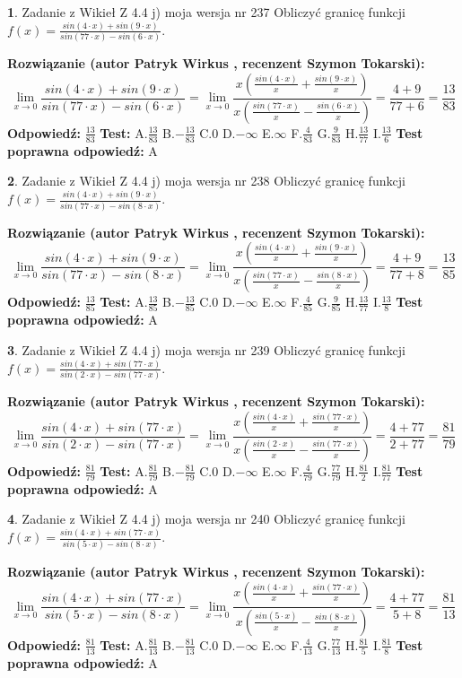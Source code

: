 \documentclass[12pt, a4paper]{article}
\theoremstyle{definition} %
\newtheorem{zad}{}
\newcommand{\zadStart}[1]{\begin{zad}#1\newline}
\newcommand{\zadStop}{\end{zad}}
\newcommand{\rozwStart}[2]{\noindent \textbf{Rozwiązanie (autor #1 , recenzent #2): }\newline}
\newcommand{\rozwStop}{\newline}
\newcommand{\odpStart}{\noindent \textbf{Odpowiedź:}\newline}
\newcommand{\odpStop}{\newline}
\newcommand{\testStart}{\noindent \textbf{Test:}\newline}
\newcommand{\testStop}{\newline}
\newcommand{\kluczStart}{\noindent \textbf{Test poprawna odpowiedź:}\newline}
\newcommand{\kluczStop}{\newline}
\begin{document}
\zadStart{Zadanie z Wikieł Z 4.4 j) moja wersja nr 237}
Obliczyć granicę funkcji $f(x)=\frac{sin(4\cdot x) +sin(9\cdot x)}{sin(77\cdot x) -sin(6\cdot x)}$.
\zadStop
\rozwStart{Patryk Wirkus}{Szymon Tokarski}
$$\lim\limits_{x\to 0}\frac{sin(4\cdot x) +sin(9\cdot x)}{sin(77\cdot x) -sin(6\cdot x)}=\lim\limits_{x\to 0}\frac{x(\frac{sin(4\cdot x)}{x}+\frac{sin(9\cdot x)}{x})}{x(\frac{sin(77\cdot x)}{x}-\frac{sin(6\cdot x)}{x})}=\frac{4+9}{77+6} = \frac{13}{83}$$
\rozwStop
\odpStart
$\frac{13}{83}$
\odpStop
\testStart
A.$\frac{13}{83}$
B.$-\frac{13}{83}$
C.$0$
D.$-\infty$
E.$\infty$
F.$\frac{4}{83}$
G.$\frac{9}{83}$
H.$\frac{13}{77}$
I.$\frac{13}{6}$
\testStop
\kluczStart
A
\kluczStop



\zadStart{Zadanie z Wikieł Z 4.4 j) moja wersja nr 238}
Obliczyć granicę funkcji $f(x)=\frac{sin(4\cdot x) +sin(9\cdot x)}{sin(77\cdot x) -sin(8\cdot x)}$.
\zadStop
\rozwStart{Patryk Wirkus}{Szymon Tokarski}
$$\lim\limits_{x\to 0}\frac{sin(4\cdot x) +sin(9\cdot x)}{sin(77\cdot x) -sin(8\cdot x)}=\lim\limits_{x\to 0}\frac{x(\frac{sin(4\cdot x)}{x}+\frac{sin(9\cdot x)}{x})}{x(\frac{sin(77\cdot x)}{x}-\frac{sin(8\cdot x)}{x})}=\frac{4+9}{77+8} = \frac{13}{85}$$
\rozwStop
\odpStart
$\frac{13}{85}$
\odpStop
\testStart
A.$\frac{13}{85}$
B.$-\frac{13}{85}$
C.$0$
D.$-\infty$
E.$\infty$
F.$\frac{4}{85}$
G.$\frac{9}{85}$
H.$\frac{13}{77}$
I.$\frac{13}{8}$
\testStop
\kluczStart
A
\kluczStop



\zadStart{Zadanie z Wikieł Z 4.4 j) moja wersja nr 239}
Obliczyć granicę funkcji $f(x)=\frac{sin(4\cdot x) +sin(77\cdot x)}{sin(2\cdot x) -sin(77\cdot x)}$.
\zadStop
\rozwStart{Patryk Wirkus}{Szymon Tokarski}
$$\lim\limits_{x\to 0}\frac{sin(4\cdot x) +sin(77\cdot x)}{sin(2\cdot x) -sin(77\cdot x)}=\lim\limits_{x\to 0}\frac{x(\frac{sin(4\cdot x)}{x}+\frac{sin(77\cdot x)}{x})}{x(\frac{sin(2\cdot x)}{x}-\frac{sin(77\cdot x)}{x})}=\frac{4+77}{2+77} = \frac{81}{79}$$
\rozwStop
\odpStart
$\frac{81}{79}$
\odpStop
\testStart
A.$\frac{81}{79}$
B.$-\frac{81}{79}$
C.$0$
D.$-\infty$
E.$\infty$
F.$\frac{4}{79}$
G.$\frac{77}{79}$
H.$\frac{81}{2}$
I.$\frac{81}{77}$
\testStop
\kluczStart
A
\kluczStop



\zadStart{Zadanie z Wikieł Z 4.4 j) moja wersja nr 240}
Obliczyć granicę funkcji $f(x)=\frac{sin(4\cdot x) +sin(77\cdot x)}{sin(5\cdot x) -sin(8\cdot x)}$.
\zadStop
\rozwStart{Patryk Wirkus}{Szymon Tokarski}
$$\lim\limits_{x\to 0}\frac{sin(4\cdot x) +sin(77\cdot x)}{sin(5\cdot x) -sin(8\cdot x)}=\lim\limits_{x\to 0}\frac{x(\frac{sin(4\cdot x)}{x}+\frac{sin(77\cdot x)}{x})}{x(\frac{sin(5\cdot x)}{x}-\frac{sin(8\cdot x)}{x})}=\frac{4+77}{5+8} = \frac{81}{13}$$
\rozwStop
\odpStart
$\frac{81}{13}$
\odpStop
\testStart
A.$\frac{81}{13}$
B.$-\frac{81}{13}$
C.$0$
D.$-\infty$
E.$\infty$
F.$\frac{4}{13}$
G.$\frac{77}{13}$
H.$\frac{81}{5}$
I.$\frac{81}{8}$
\testStop
\kluczStart
A
\kluczStop
\end{document}
